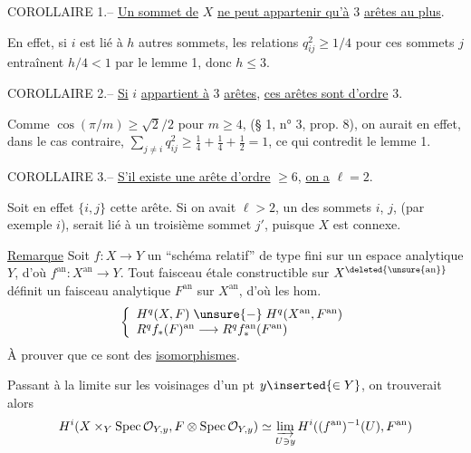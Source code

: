 COROLLAIRE 1.-- \uline{Un sommet de} $X$ \uline{ne peut appartenir qu'à} 3 \uline{arêtes au plus}.

En effet, si $i$ est lié à $h$ autres sommets, les relations $q_{ij}^2\geq1/4$ pour ces sommets $j$ entraînent $h/4<1$ par le lemme 1, donc $h\leq3$.

COROLLAIRE 2.-- \uline{Si} $i$ \uline{appartient à} 3 \uline{arêtes}, \uline{ces arêtes sont d'ordre} 3.

Comme $\cos(\pi/m)\geq\sqrt2/2$ pour $m\geq4$, (§ 1, n° 3, prop. 8), on aurait en effet, dans le cas contraire, $\sum_{j\ne i}q_{ij}^2\geq\frac14+\frac14+\frac12=1$, ce qui contredit le lemme 1.

COROLLAIRE 3.-- \uline{S'il existe une arête d'ordre} $\geq6$, \uline{on a} $\ell=2$.

Soit en effet $\{i,j\}$ cette arête. Si on avait $\ell>2$, un des sommets $i$, $j$, (par exemple $i$), serait lié à un troisième sommet $j'$, puisque $X$ est connexe.


\uline{Remarque} Soit $f:X\longrightarrow Y$ un ``schéma relatif'' de type fini sur un espace analytique $Y$, d'où $f^{\mathrm{an}}:X^{\mathrm{an}}\longrightarrow Y$. Tout faisceau étale constructible  sur $X^{\deleted{\unsure{\mathrm{an}}}}$ définit un faisceau analytique $F^{\mathrm{an}}$ sur $X^{\mathrm{an}}$, d'où les hom.
\[
\left\{\begin{array}{l}
H^q(X,F)\;\unsure{-}\;H^q(X^{\mathrm{an}},F^{\mathrm{an}})\\
R^q f_*(F)^{\mathrm{an}}\longrightarrow R^q f^{\mathrm{an}}_*(F^{\mathrm{an}})
\end{array}\right.
\]
À prouver que ce sont des \uline{isomorphismes}.


\uline{} Passant à la limite sur les voisinages d'un pt $y\inserted{\in Y}$, on trouverait alors
\[
H^i(X\times_Y\operatorname{Spec}\mathcal O_{Y,y},
 F\otimes\operatorname{Spec}\mathcal O_{Y,y})
\simeq\varinjlim_{U\ni y}H^i((f^{\mathrm{an}})^{-1}(U),F^{\mathrm{an}})
\]
\margin{$*$}

